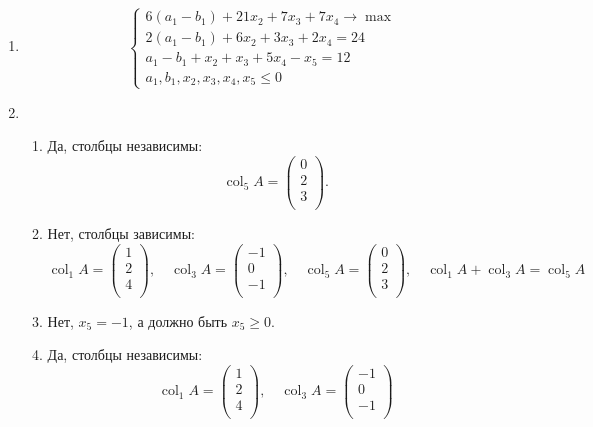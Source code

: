 \documentclass[12pt]{article}
\DeclareMathOperator{\col}{col}
\begin{document}
\begin{enumerate}
\item 
\[
\begin{cases}
  6(a_1 - b_1) + 21x_2 + 7x_3 + 7x_4 \to \max \\
  2(a_1 - b_1) + 6x_2 + 3x_3 +2x_4 = 24 \\
  a_1 - b_1 + x_2 + x_3 + 5x_4 - x_5 = 12 \\
  a_1, b_1, x_2, x_3, x_4, x_5 \leq 0    
\end{cases}
\]

\item 
\begin{enumerate}
  \item Да, столбцы независимы:
  \[
  \col_5 A = \begin{pmatrix}
    0 \\ 
    2 \\ 
    3 \\
  \end{pmatrix}.
  \]
  \item Нет, столбцы зависимы:
  \[
  \col_1 A = \begin{pmatrix}
    1 \\
    2 \\
    4 \\
  \end{pmatrix}, \quad 
  \col_3 A = \begin{pmatrix}
    -1 \\
    0 \\
    -1 \\
  \end{pmatrix}, \quad 
  \col_5 A = \begin{pmatrix}
    0 \\ 
    2 \\ 
    3 \\
  \end{pmatrix}, \quad 
  \col_1 A + \col_3 A = \col_5 A
  \]
  \item Нет, $x_5  = -1$, а должно быть $x_5 \geq 0$. 
  \item Да, столбцы независимы:
  \[
    \col_1 A = \begin{pmatrix}
      1 \\
      2 \\
      4 \\
    \end{pmatrix}, \quad 
    \col_3 A = \begin{pmatrix}
      -1 \\
      0 \\
      -1 \\
    \end{pmatrix}
  \]

\end{enumerate}



\end{enumerate}
\end{document}
